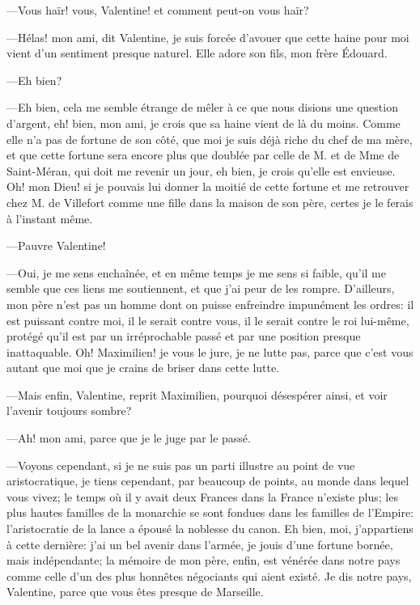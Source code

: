 —Vous haïr! vous, Valentine! et comment peut-on vous haïr? 

—Hélas! mon ami, dit Valentine, je suis forcée d'avouer que cette haine pour moi vient d'un sentiment presque naturel. Elle adore son fils, mon frère Édouard. 

—Eh bien?  

—Eh bien, cela me semble étrange de mêler à ce que nous disions une question d'argent, eh! bien, mon ami, je crois que sa haine vient de là du moins. Comme elle n'a pas de fortune de son côté, que moi je suis déjà riche du chef de ma mère, et que cette fortune sera encore plus que doublée par celle de M. et de Mme de Saint-Méran, qui doit me revenir un jour, eh bien, je crois qu'elle est envieuse. Oh! mon Dieu! si je pouvais lui donner la moitié de cette fortune et me retrouver chez M. de Villefort comme une fille dans la maison de son père, certes je le ferais à l'instant même. 

—Pauvre Valentine! 

—Oui, je me sens enchaînée, et en même temps je me sens si faible, qu'il me semble que ces liens me soutiennent, et que j'ai peur de les rompre. D'ailleurs, mon père n'est pas un homme dont on puisse enfreindre impunément les ordres: il est puissant contre moi, il le serait contre vous, il le serait contre le roi lui-même, protégé qu'il est par un irréprochable passé et par une position presque inattaquable. Oh! Maximilien! je vous le jure, je ne lutte pas, parce que c'est vous autant que moi que je crains de briser dans cette lutte. 

—Mais enfin, Valentine, reprit Maximilien, pourquoi désespérer ainsi, et voir l'avenir toujours sombre? 

—Ah! mon ami, parce que je le juge par le passé. 

—Voyons cependant, si je ne suis pas un parti illustre au point de vue aristocratique, je tiens cependant, par beaucoup de points, au monde dans lequel vous vivez; le temps où il y avait deux Frances dans la France n'existe plus; les plus hautes familles de la monarchie se sont fondues dans les familles de l'Empire: l'aristocratie de la lance a épousé la noblesse du canon. Eh bien, moi, j'appartiens à cette dernière: j'ai un bel avenir dans l'armée, je jouis d'une fortune bornée, mais indépendante; la mémoire de mon père, enfin, est vénérée dans notre pays comme celle d'un des plus honnêtes négociants qui aient existé. Je dis notre pays, Valentine, parce que vous êtes presque de Marseille. 


